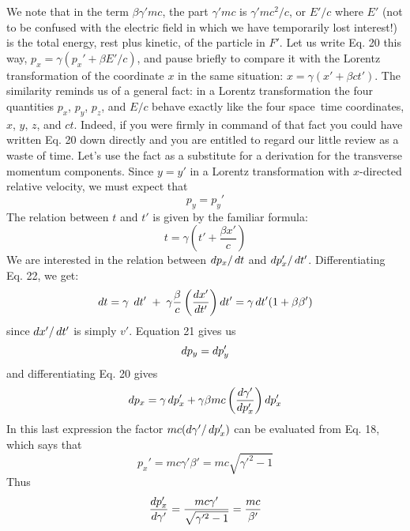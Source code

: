 We note that in the term $\beta\gamma'mc$, the part $\gamma'mc$ is $\gamma'mc^2/c$, or $E'/c$
where $E'$ (not to be confused with the electric field in which we have
temporarily lost interest!) is the total energy, rest plus kinetic, of the
particle in $F'$. Let us write Eq. 20 this way, $p_x = \gamma(p_x' + \beta E'/c)$, and
pause briefly to compare it with the Lorentz transformation of the
coordinate $x$ in the same situation: $x = \gamma(x' + \beta ct')$. The similarity
reminds us of a general fact: in a Lorentz transformation the four
quantities $p_x$, $p_y$, $p_z$, and $E/c$ behave exactly like the four space~time
coordinates, $x$, $y$, $z$, and $ct$. Indeed, if you were firmly in command
of that fact you could have written Eq. 20 down directly and you are
entitled to regard our little review as a waste of time. Let's use the
fact as a substitute for a derivation for the transverse momentum
components. Since $y = y'$ in a Lorentz transformation with
$x$-directed relative velocity, we must expect that
\begin{equation}
  p_y = p_y'
\end{equation}
The relation between $t$ and $t'$ is given by the familiar formula:
\begin{equation}
  t = \gamma\left(t'+\frac{\beta x'}{c}\right)
\end{equation}
We are interested in the relation between $\mathop{d\!} p_x/\mathop{d\!} t$ and $\mathop{d\!} p_x'/\mathop{d\!} t'$.
Differentiating Eq. 22, we get:
\begin{equation}
  \mathop{d\!} t = \gamma\; \mathop{d\!} t'\;+\;\gamma\frac{\beta}{c}\left(\frac{\mathop{d\!} x'}{\mathop{d\!} t'}\right)\mathop{d\!} t'
        = \gamma \mathop{d\!} t'(1+\beta\beta')
\end{equation}
since $\mathop{d\!} x'/\mathop{d\!} t'$ is simply $v'$. Equation 21 gives us
\begin{equation}
  \mathop{d\!} p_y = \mathop{d\!} p_y'
\end{equation}
and differentiating Eq. 20 gives
\begin{equation}
  \mathop{d\!} p_x = \gamma \mathop{d\!} p_x' + \gamma\beta mc\left(\frac{\mathop{d\!}\gamma'}{\mathop{d\!} p_x'}\right)\mathop{d\!} p_x'
\end{equation}
In this last expression the factor $mc(\mathop{d\!}\gamma'/\mathop{d\!} p_x')$ can be evaluated from
Eq. 18, which says that
\begin{equation}
  p_x' = mc\gamma'\beta' = mc\sqrt{\gamma'^2-1}
\end{equation}
Thus
\begin{equation}
  \frac{\mathop{d\!} p_x'}{\mathop{d\!}\gamma'} = \frac{mc\gamma'}{\sqrt{\gamma'^2-1}} = \frac{mc}{\beta'}
\end{equation}
